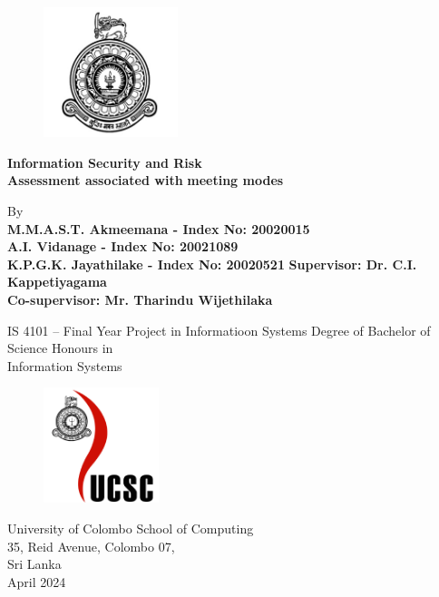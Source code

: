     \newpage
    \begin{figure}
        \centering
        \vspace*{0cm}\includegraphics[width=0.35\textwidth]{uoc_logo.jpg}
    \end{figure}
    \begin{center}
        \begin{LARGE}  
            \textbf{Information Security and Risk\\ Assessment associated with}
            \textbf{meeting modes}
        \end{LARGE}  
        \break\break
        By\\
        \textbf{M.M.A.S.T. Akmeemana - Index No: 20020015\\ A.I. Vidanage - Index No: 20021089\\ K.P.G.K. Jayathilake - Index No: 20020521}
        \break\break
        \textbf{Supervisor: Dr. C.I. Kappetiyagama\\ Co-supervisor: Mr. Tharindu Wijethilaka}
        \break\break
        \begin{large}  
            IS 4101 – Final Year Project in Informatioon Systems
            \break\break
            Degree of Bachelor of Science Honours in\\ Information Systems
            \break\break
        \end{large}
        
        \begin{figure}[h]
            \centering
            \includegraphics[width=0.3\textwidth]{ucsc_logo.png}
        \end{figure}
        \begin{large}  
            University of Colombo School of Computing\\
            35, Reid Avenue, Colombo 07,\\
            Sri Lanka\\
            April 2024
        \end{large}
    \end{center}

